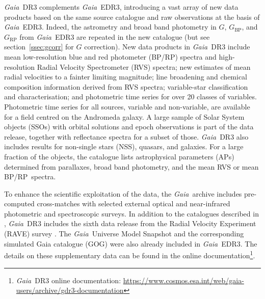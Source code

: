 \documentclass[longauth]{aa}
\providecommand{\bprp}{BP/RP\xspace}
\providecommand{\bpmag}{\ensuremath{G_\mathrm{BP}}\xspace}
\providecommand{\rpmag}{\ensuremath{G_\mathrm{RP}}\xspace}
\providecommand\gmag{\ensuremath{G}\xspace}
\newcommand\gaia{\textit{Gaia}\xspace}
\providecommand\gedrthree{\textit{Gaia}~EDR3\xspace}
\providecommand\gdrthree{\textit{Gaia}~DR3\xspace}
\providecommand\gdr[1]{\textit{Gaia}~DR#1\xspace}
\begin{document}
\gdrthree complements \gedrthree, introducing a vast array of new data products based on the same source catalogue and raw observations at the basis of \gedrthree. Indeed, the astrometry and broad band photometry in \gmag, \bpmag, and \rpmag from \gedrthree are repeated in the new catalogue (but see section~\ref{ssec:gcorr} for \gmag  correction). New data products in \gdrthree include mean low-resolution blue and red photometer (\bprp) spectra and high-resolution Radial Velocity Spectrometer (RVS) spectra; new estimates of mean radial velocities to a fainter limiting magnitude; line broadening and chemical composition information derived from RVS spectra; variable-star classification and characterisation; and photometric time series for over 20 classes of variables. Photometric time series for all sources, variable and non-variable, are available for a field centred on the Andromeda galaxy. A large sample of Solar System objects (SSOs) with orbital solutions and epoch observations is part of the data release, together with  reflectance spectra for a subset of those. \gdrthree also includes results for non-single stars (NSS), quasars, and galaxies. For a large fraction of the objects, the catalogue lists astrophysical parameters (APs) determined from parallaxes, broad band photometry, and the mean RVS or mean \bprp\ spectra. 

To enhance the scientific exploitation of the data, the \gaia\ archive includes pre-computed cross-matches with selected  external optical and near-infrared photometric and spectroscopic surveys. In addition to the catalogues described in \citet{EDR3-DPACP-130}, \gdrthree includes the sixth data release from the Radial Velocity Experiment (RAVE) survey \citep{2020AJ....160...83S}.
The \gaia\ Universe Model Snapshot \citep[GUMS, version 20,][]{2012A&A...543A.100R} and the corresponding simulated Gaia catalogue (GOG) were also already included in \gedrthree. The details on these supplementary data can be found in the online documentation\footnote{\gdr{3} online documentation: \url{https://www.cosmos.esa.int/web/gaia-users/archive/gdr3-documentation}}. 
\end{document}
